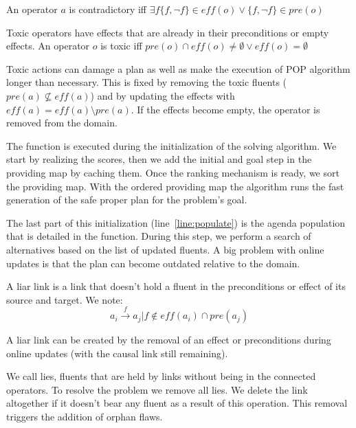 \begin{definition}

An operator \(a\) is contradictory iff
\(\exists f \{f, \lnot f \} \in eff(o) \lor \{f, \lnot f \} \in pre(o)\)

\end{definition}

\begin{definition}\label{def:toxic}

Toxic operators have effects that are already in their preconditions or
empty effects. An operator \(o\) is toxic iff
\(pre(o) \cap eff(o) \neq \emptyset \lor eff(o) = \emptyset\)

\end{definition}

Toxic actions can damage a plan as well as make the execution of POP
algorithm longer than necessary. This is fixed by removing the toxic
fluents (\(pre(a) \nsubseteq eff(a)\)) and by updating the effects with
\(eff(a) = eff(a) \setminus pre(a)\). If the effects become empty, the
operator is removed from the domain.

The  function is executed during the
initialization of the solving algorithm. We start by realizing the
scores, then we add the initial and goal step in the providing map by
caching them. Once the ranking mechanism is ready, we sort the providing
map. With the ordered providing map the algorithm runs the fast
generation of the safe proper plan for the problem's goal.

The last part of this initialization (line~\ref{line:populate}) is the
agenda population that is detailed in the  function.
During this step, we perform a search of alternatives based on the list
of updated fluents. A big problem with online updates is that the plan
can become outdated relative to the domain.

\begin{definition}

A liar link is a link that doesn't hold a fluent in the preconditions or
effect of its source and target. We note:
\[a_i \xrightarrow{f} a_j | f \notin eff(a_i) \cap pre(a_j)\]

\end{definition}

A liar link can be created by the removal of an effect or preconditions
during online updates (with the causal link still remaining).

We call lies, fluents that are held by links without being in the
connected operators. To resolve the problem we remove all lies. We
delete the link altogether if it doesn't bear any fluent as a result of
this operation. This removal triggers the addition of orphan flaws.

